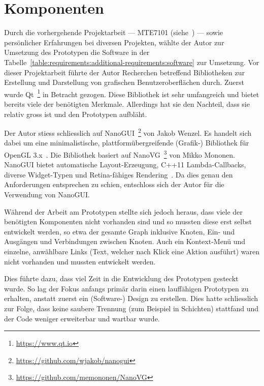 
\section{Komponenten}
\label{sec:prototype:components}

Durch die vorhergehende Projektarbeit --- MTE7101
(siehe~\cite{osterwalder_sven_volume_2016}) --- sowie persönlicher Erfahrungen
bei diversen Projekten, wählte der Autor zur Umsetzung des Prototypen die
Software in der
Tabelle~\ref{table:requirements:additional-requirements:software} zur
Umsetzung. Vor dieser Projektarbeit führte der Autor Recherchen betreffend
Bibliotheken zur Erstellung und Darstellung von grafischen Benutzeroberflächen
durch. Zuerst wurde Qt~\footnote{\url{https://www.qt.io}} in Betracht gezogen. Diese
Bibliothek ist sehr umfangreich und bietet bereits viele der benötigten
Merkmale. Allerdings hat sie den Nachteil, dass sie relativ gross ist und den
Prototypen aufbläht.

Der Autor stiess schliesslich auf
NanoGUI~\footnote{\url{https://github.com/wjakob/nanogui}} von Jakob Wenzel. Es
handelt sich dabei um eine minimalistische, plattformübergreifende (Grafik-)
Bibliothek für OpenGL 3.x~\cite{jakob_wenzel_wjakob/nanogui:_2016}.  Die
Bibliothek basiert auf
NanoVG~\footnote{\url{https://github.com/memononen/NanoVG}} von Mikko Mononen.
NanoGUI bietet automatische Layout-Erzeugung, C++11 Lambda-Callbacks, diverse
Widget-Typen und Retina-fähiges
Rendering~\cite{jakob_wenzel_wjakob/nanogui:_2016}. Da dies genau den
Anforderungen entsprechen zu schien, entschloss sich der Autor für die
Verwendung von NanoGUI.\@

Während der Arbeit am Prototypen stellte sich jedoch heraus, dass viele der
benötigten Komponenten nicht vorhanden sind und so mussten diese erst selbst
entwickelt werden, so etwa der gesamte Graph inklusive Knoten, Ein- und
Ausgängen und Verbindungen zwischen Knoten. Auch ein Kontext-Menü und einzelne,
anwählbare Links (Text, welcher nach Klick eine Aktion ausführt) waren nicht
vorhanden und mussten entwickelt werden.

Dies führte dazu, dass viel Zeit in die Entwicklung des Prototypen gesteckt
wurde. So lag der Fokus anfangs primär darin einen lauffähigen Prototypen zu
erhalten, anstatt zuerst ein (Software-) Design zu erstellen. Dies hatte
schliesslich zur Folge, dass keine saubere Trennung (zum Beispiel in Schichten)
stattfand und der Code weniger erweiterbar und wartbar wurde.

